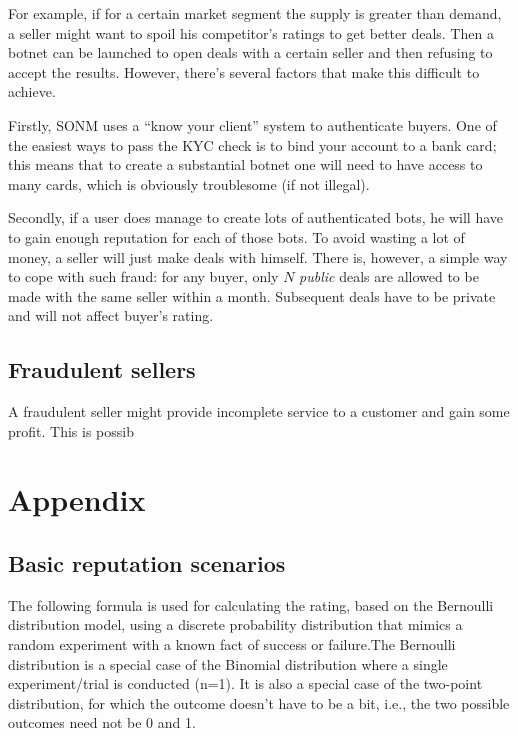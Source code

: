 \documentclass[11pt]{article}
\begin{document}
For example, if for a certain market segment the supply is greater than demand, a seller might want to spoil his competitor's ratings to get better deals. Then a botnet can be launched to open deals with a certain seller and then refusing to accept the results. However, there's several factors that make this difficult to achieve.

Firstly, SONM uses a ``know your client'' system to authenticate buyers. One of the easiest ways to pass the KYC check is to bind your account to a bank card; this means that to create a substantial botnet one will need to have access to many cards, which is obviously troublesome (if not illegal).

Secondly, if a user does manage to create lots of authenticated bots, he will have to gain enough reputation for each of those bots. To avoid wasting a lot of money, a seller will just make deals with himself. There is, however, a simple way to cope with such fraud: for any buyer, only $ N $ \textit{public} deals are allowed to be made with the same seller within a month. Subsequent deals have to be private and will not affect buyer's rating.

\subsection{Fraudulent sellers}

A fraudulent seller might provide incomplete service to a customer and gain some profit. This is possib

\section{Appendix} \label{appendix}

\subsection{Basic reputation scenarios} \label{appendix:basicReputation}

The following formula is used for calculating the rating, based on the Bernoulli distribution model, using a discrete probability distribution that mimics a random experiment with a known fact of success or failure.The Bernoulli distribution is a special case of the Binomial distribution where a single experiment/trial is conducted (n=1). It is also a special case of the two-point distribution, for which the outcome doesn't have to be a bit, i.e., the two possible outcomes need not be 0 and 1.
\end{document}
